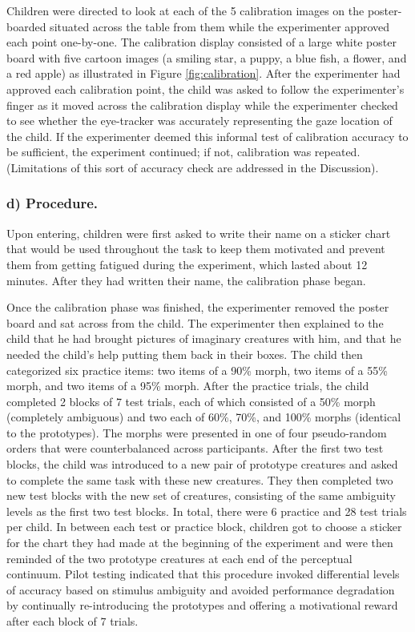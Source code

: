 \documentclass[floatsintext,man]{apa6}
\theoremstyle{definition}
\theoremstyle{definition}
\theoremstyle{definition}
\theoremstyle{remark}
\begin{document}
Children were directed to look at each of the 5 calibration images on
the poster-boarded situated across the table from them while the
experimenter approved each point one-by-one. The calibration display
consisted of a large white poster board with five cartoon images (a
smiling star, a puppy, a blue fish, a flower, and a red apple) as
illustrated in Figure \ref{fig:calibration}. After the experimenter had
approved each calibration point, the child was asked to follow the
experimenter's finger as it moved across the calibration display while
the experimenter checked to see whether the eye-tracker was accurately
representing the gaze location of the child. If the experimenter deemed
this informal test of calibration accuracy to be sufficient, the
experiment continued; if not, calibration was repeated. (Limitations of
this sort of accuracy check are addressed in the Discussion).

\subsubsection{d) Procedure.}\label{d-procedure.}

Upon entering, children were first asked to write their name on a
sticker chart that would be used throughout the task to keep them
motivated and prevent them from getting fatigued during the experiment,
which lasted about 12 minutes. After they had written their name, the
calibration phase began.

Once the calibration phase was finished, the experimenter removed the
poster board and sat across from the child. The experimenter then
explained to the child that he had brought pictures of imaginary
creatures with him, and that he needed the child's help putting them
back in their boxes. The child then categorized six practice items: two
items of a 90\% morph, two items of a 55\% morph, and two items of a
95\% morph. After the practice trials, the child completed 2 blocks of 7
test trials, each of which consisted of a 50\% morph (completely
ambiguous) and two each of 60\%, 70\%, and 100\% morphs (identical to
the prototypes). The morphs were presented in one of four pseudo-random
orders that were counterbalanced across participants. After the first
two test blocks, the child was introduced to a new pair of prototype
creatures and asked to complete the same task with these new creatures.
They then completed two new test blocks with the new set of creatures,
consisting of the same ambiguity levels as the first two test blocks. In
total, there were 6 practice and 28 test trials per child. In between
each test or practice block, children got to choose a sticker for the
chart they had made at the beginning of the experiment and were then
reminded of the two prototype creatures at each end of the perceptual
continuum. Pilot testing indicated that this procedure invoked
differential levels of accuracy based on stimulus ambiguity and avoided
performance degradation by continually re-introducing the prototypes and
offering a motivational reward after each block of 7 trials.
\end{document}
